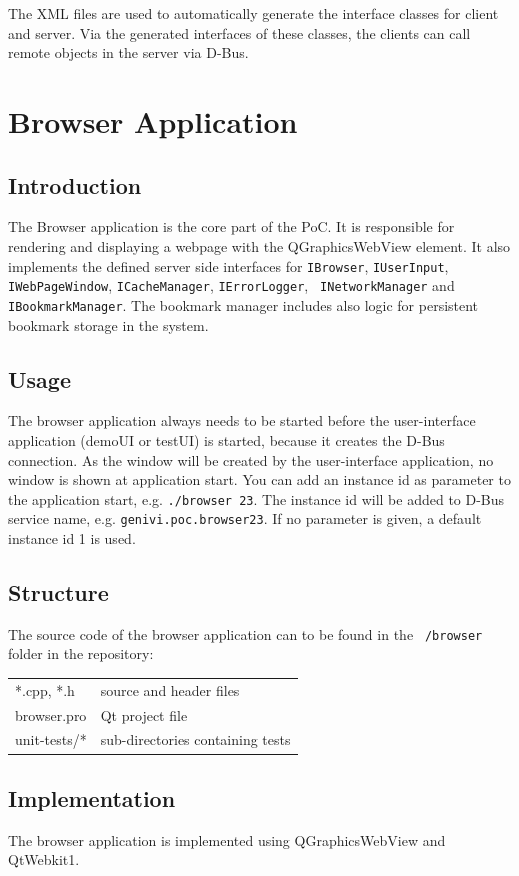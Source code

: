 \documentclass{pelagicore}
\begin{document}
The XML files are used to automatically generate the interface classes for
client and server. Via the generated interfaces of these classes, the clients
can call remote objects in the server via D-Bus.

\section{Browser Application}
\subsection{Introduction}
The Browser application is the core part of the PoC. It is responsible for
rendering and displaying a webpage with the QGraphicsWebView element. It also
implements the defined server side interfaces for \texttt{IBrowser}, {\tt IUserInput},
{\tt IWebPageWindow}, {\tt ICacheManager}, {\tt IErrorLogger}, {\tt
INetworkManager} and {\tt IBookmarkManager}. The bookmark manager includes also
logic for persistent bookmark storage in the system.

\subsection{Usage}
The browser application always needs to be started before the user-interface
application (demoUI or testUI) is started, because it creates the D-Bus
connection. As the window will be created by the user-interface application, no
window is shown at application start.  You can add an instance id as parameter
to the application start, e.g. {\tt ./browser 23}. The instance id will be
added to D-Bus service name, e.g. {\tt genivi.poc.browser23}. If no parameter
is given, a default instance id 1 is used.

\subsection{Structure}
The source code of the browser application can to be found in the {\tt
/browser} folder in the repository:

\begin{tabular}{l l}
    *.cpp, *.h         & source and header files \\
    browser.pro        & Qt project file \\
    unit-tests/*       & sub-directories containing tests \\
\end{tabular}

\subsection{Implementation}
The browser application is implemented using QGraphicsWebView and QtWebkit1.
\end{document}
